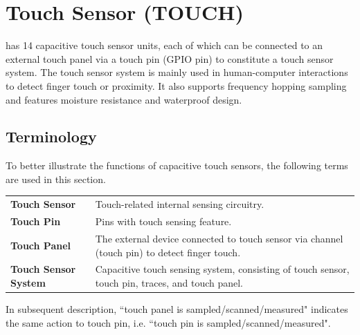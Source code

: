 \documentclass[main\_\_EN.tex]{subfiles}
\begin{document}
\setenglishformatting

\ifglobal
\else
    \clearpage
    \listoftodos
    \listofdonetodos
    \tableofcontents
\fi





\hypertarget{tchsen}{}
\chapter{Touch Sensor (TOUCH)}
\label{mod:tchsen}

\chipname{} has 14 capacitive touch sensor units, each of which can be connected to an external touch panel via a touch pin (GPIO pin) to constitute a touch sensor system. The \chipname{} touch sensor system is mainly used in human-computer interactions to detect finger touch or proximity. It also supports frequency hopping sampling and features moisture resistance and waterproof design.

\section{Terminology}
\label{sec:tchsen-term}

To better illustrate the functions of capacitive touch sensors, the following terms are used in this section.

\begin{longtable}[c]{ R{7cm} p{9cm} }
\textbf{Touch Sensor}  & Touch-related internal sensing circuitry. \\
\textbf{Touch Pin}    & Pins with touch sensing feature. \\ 
\textbf{Touch Panel}  & The external device connected to touch sensor via channel (touch pin) to detect finger touch. \\
\textbf{Touch Sensor System}  & Capacitive touch sensing system, consisting of touch sensor, touch pin, traces, and touch panel. \\
\end{longtable}

\vspace{-1em}
\begin{tiplisting}
    In subsequent description, ``touch panel is sampled/scanned/measured" indicates the same action to touch pin, i.e. ``touch pin is sampled/scanned/measured".
\end{tiplisting}
\vspace{-2em}
\end{document}
